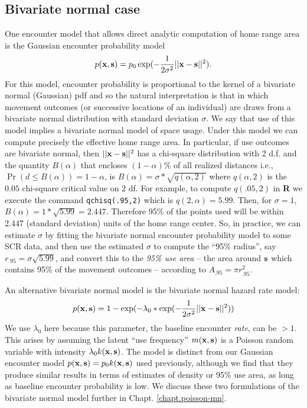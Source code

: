 \subsection{Bivariate normal case}

One encounter model that allows direct analytic computation
of home range area is the Gaussian encounter probability model
\[
p({\bf x},{\bf s}) = p_{0} \exp(-\frac{1}{2\sigma^2} ||{\bf x}-{\bf s}||^2).
\]
For this model, encounter probability is proportional to the kernel of
a bivariate normal (Gaussian) pdf and so the natural interpretation is
that in which movement outcomes (or successive locations of an
individual) are draws from a bivariate normal distribution with
standard deviation $\sigma$. We say that use of this model implies a
 bivariate normal model of space usage.
Under this model we can compute precisely the effective home range
area. In particular, if use outcomes are bivariate normal, then
$||{\bf x}-{\bf s}||^2$ has a chi-square distribution with 2 d.f. and
the quantity $B(\alpha)$ that encloses $(1-\alpha)$\% of all realized
distances i.e., $\Pr(d\le B(\alpha)) = 1-\alpha$, is $B(\alpha) =
\sigma*\sqrt{q(\alpha,2)}$ where $q(\alpha,2)$ is the $0.05$
chi-square critical value on $2$ df. For example, to compute $q(.05,
2)$ in {\bf R} we execute the command \mbox{\tt qchisq(.95,2)} which
is $q(2,\alpha) = 5.99$. Then, for $\sigma=1$, $B(\alpha) =
1*\sqrt{5.99} = 2.447$.  Therefore 95\% of the points used will be
within 2.447 (standard deviation) units of the home range center. So,
in practice, we can estimate $\sigma$ by fitting the bivariate normal
encounter probability model to some SCR data, and then use the
estimated $\sigma$ to compute the ``95\% radius'', say $r_{.95} =
\sigma \sqrt{5.99}$, and convert this to the {\it 95\% use area} --
the area around ${\bf s}$ which contains 95\% of the movement outcomes
-- according to $A_{.95} = \pi r_{.95}^{2}$.

An alternative bivariate normal model is the bivariate normal hazard
rate model:
\begin{equation}
p({\bf x},{\bf s}) = 1-\exp(-\lambda_{0}*\exp(-\frac{1}{2\sigma^{2}} ||{\bf x}-{\bf s}||^2))
\label{scr0.eq.hazard}
\end{equation}
We use $\lambda_{0}$ here because this parameter, the baseline
encounter {\it rate}, can be $>1$.  This arises by assuming the latent
``use frequency'' $m({\bf x},{\bf s})$ is a Poisson random variable
with intensity $\lambda_0 k({\bf x},{\bf s})$. The model is distinct
from our Gaussian encounter model $p({\bf x},{\bf s}) = p_0 k({\bf
  x},{\bf s})$ used previously, although we find that they produce
similar results in terms of estimates of density or 95\% use area, as
long as baseline encounter probability is low.  We discuss these two
formulations of the bivariate normal model further in
Chapt. \ref{chapt.poisson-mn}.

